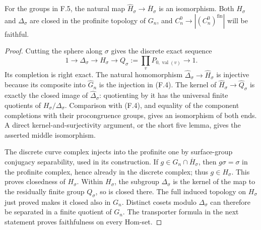 For the groups in F.5, the natural map $\widehat H_\sigma\to\overline H_\sigma$ is an isomorphism. Both $H_\sigma$ and $\Delta_\sigma$ are closed in the profinite topology of $G_n$, and $C_n^0\to|(C_n^0)^{\mathrm{fin}}|$ will be faithful.
\begin{proof}
Cutting the sphere along $\sigma$ gives the discrete exact sequence
\[
1\to\Delta_\sigma\to H_\sigma\to
 Q_\sigma:=\prod_vP_{0,\operatorname{val}(v)}\to1.
\]
Its completion is right exact. The natural homomorphism $\widehat\Delta_\sigma\to\widehat H_\sigma$ is injective because its composite into $\widehat G_n$ is the injection in (F.4). The kernel of $\widehat H_\sigma\to\widehat Q_\sigma$ is exactly the closed image of $\widehat\Delta_\sigma$: quotienting by it has the universal finite quotients of $H_\sigma/\Delta_\sigma$. Comparison with (F.4), and equality of the component completions with their procongruence groups, gives an isomorphism of both ends. A direct kernel-and-surjectivity argument, or the short five lemma, gives the asserted middle isomorphism.

The discrete curve complex injects into the profinite one by surface-group conjugacy separability, used in its construction. If $g\in G_n\cap\overline H_\sigma$, then $g\sigma=\sigma$ in the profinite complex, hence already in the discrete complex; thus $g\in H_\sigma$. This proves closedness of $H_\sigma$. Within $H_\sigma$, the subgroup $\Delta_\sigma$ is the kernel of the map to the residually finite group $Q_\sigma$, so is closed there. The full induced topology on $H_\sigma$ just proved makes it closed also in $G_n$. Distinct cosets modulo $\Delta_\sigma$ can therefore be separated in a finite quotient of $G_n$. The transporter formula in the next statement proves faithfulness on every Hom-set.
\end{proof}


